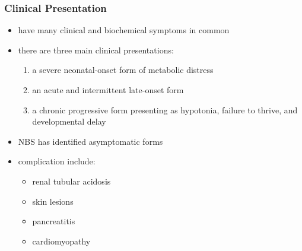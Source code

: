 \documentclass{scrartcl}
\begin{document}
\subsubsection{Clinical Presentation}
\label{sec:org9fa889e}
\begin{itemize}
\item have many clinical and biochemical symptoms in common
\item there are three main clinical presentations:
\begin{enumerate}
\item a severe neonatal-onset form of metabolic distress
\item an acute and intermittent late-onset form
\item a chronic progressive form presenting as hypotonia, failure to
thrive, and developmental delay
\end{enumerate}
\item NBS has identified asymptomatic forms

\item complication include:
\begin{itemize}
\item renal tubular acidosis
\item skin lesions
\item pancreatitis
\item cardiomyopathy
\end{itemize}
\end{itemize}
\end{document}
